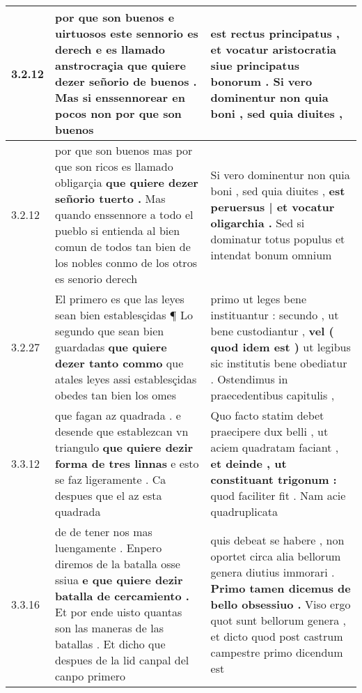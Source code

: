 \begin{tabular}{|p{1cm}|p{6.5cm}|p{6.5cm}|}
3.2.12 & por que son buenos e uirtuosos este sennorio es derech e es llamado anstrocraçia \textbf{ que quiere dezer señorio de buenos . } Mas si enssennorear en pocos non por que son buenos & est rectus principatus , et vocatur aristocratia \textbf{ siue principatus bonorum . } Si vero dominentur non quia boni , sed quia diuites , \\\hline
3.2.12 & por que son buenos mas por que son ricos es llamado obligarçia \textbf{ que quiere dezer señorio tuerto . } Mas quando enssennore a todo el pueblo si entienda al bien comun de todos tan bien de los nobles conmo de los otros es senorio derech & Si vero dominentur non quia boni , sed quia diuites , \textbf{ est peruersus | et vocatur oligarchia . } Sed si dominatur totus populus et intendat bonum omnium \\\hline
3.2.27 & El primero es que las leyes sean bien establesçidas ¶ Lo segundo que sean bien guardadas \textbf{ que quiere dezer tanto commo } que atales leyes assi establesçidas obedes tan bien los omes & primo ut leges bene instituantur : secundo , ut bene custodiantur , \textbf{ vel ( quod idem est ) } ut legibus sic institutis bene obediatur . Ostendimus in praecedentibus capitulis , \\\hline
3.3.12 & que fagan az quadrada . e desende que establezcan vn triangulo \textbf{ que quiere dezir forma de tres linnas } e esto se faz ligeramente . Ca despues que el az esta quadrada & Quo facto statim debet praecipere dux belli , ut aciem quadratam faciant , \textbf{ et deinde , ut constituant trigonum : } quod faciliter fit . Nam acie quadruplicata \\\hline
3.3.16 & de de tener nos mas luengamente . Enpero diremos de la batalla osse ssiua \textbf{ e que quiere dezir batalla de cercamiento . } Et por ende uisto quantas son las maneras de las batallas . Et dicho que despues de la lid canpal del canpo primero & quis debeat se habere , non oportet circa alia bellorum genera diutius immorari . \textbf{ Primo tamen dicemus de bello obsessiuo . } Viso ergo quot sunt bellorum genera , et dicto quod post castrum campestre primo dicendum est \\\hline

\end{tabular}
